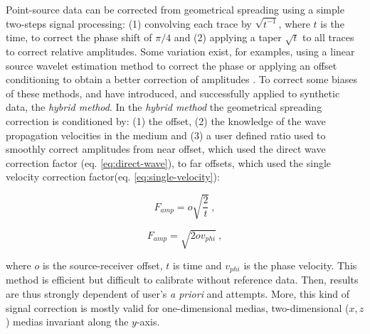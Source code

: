 \documentclass[manuscript,revised]{geophysics}
\begin{document}
\noindent Point-source data can be corrected from geometrical spreading using a simple two-steps signal processing: (1) convolving each trace by $\sqrt{t^{-1}}$, where $t$ is the time, to correct the phase shift of $\pi/4$ and (2) applying a taper $\sqrt{t}$ to all traces to correct relative amplitudes. Some variation exist, for examples, using a linear source wavelet estimation method to correct the phase \citep{Bretaudeau_FWI_2013} or applying an offset conditioning to obtain a better correction of amplitudes \citep{Tran_SWT_2013}. To correct some biases of these methods, \citet{Forbriger_LSS_2014} and \citet{Schafer_LSS_2014} have introduced, and successfully applied to synthetic data, the \textit{hybrid method}. In the \textit{hybrid method} the geometrical spreading correction is conditioned by: (1) the offset, (2) the knowledge of the wave propagation velocities in the medium and (3) a user defined ratio used to smoothly correct amplitudes from near offset, which used the direct wave correction factor (eq. \ref{eq:direct-wave}), to far offsets, which used the single velocity correction factor(eq. \ref{eq:single-velocity}): 

\begin{equation}
	\label{eq:direct-wave}
	F_{amp}=o\sqrt{\frac{2}{t}}\ ,
\end{equation}

\begin{equation}
	\label{eq:single-velocity}
	F_{amp}=\sqrt{2ov_{phi}}\ ,
\end{equation}

\noindent where $o$ is the source-receiver offset, $t$ is time and $v_{phi}$ is the phase velocity. This method is efficient but difficult to calibrate without reference data. Then, results are thus strongly dependent of user's \textit{a priori} and attempts. More, this kind of signal correction is mostly valid for one-dimensional medias, two-dimensional ($x,z$) medias invariant along the $y$-axis.    
\end{document}
